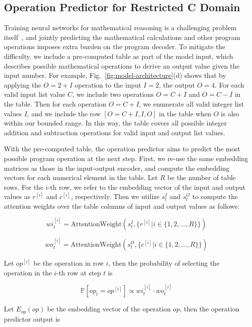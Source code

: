 
\subsection{Operation Predictor for Restricted C Domain}
\label{app:operation-predictor}
Training neural networks for mathematical reasoning is a challenging problem itself~\cite{saxton2019analysing,lample2019deep}, and jointly predicting the mathematical calculations and other program operations imposes extra burden on the program decoder. To mitigate the difficulty, we include a pre-computed table as part of the model input, which describes possible mathematical operations to derive an output value given the input number. For example, Fig.~\ref{fig:model-architecture}(d) shows that by applying the $O = 2 + I$ operation to the input $I=2$, the output $O=4$. For each valid input list value $C$, we include two operations $O = C + I$ and $O = C - I$ in the table. Then for each operation $O = C + I$, we enumerate all valid integer list values $I$, and we include the row $[O = C + I, I, O]$ in the table when $O$ is also within our bounded range. In this way, the table covers all possible integer addition and subtraction operations for valid input and output list values.  

With the pre-computed table, the operation predictor aims to predict the most possible program operation at the next step. First, we re-use the same embedding matrices as those in the input-output encoder, and compute the embedding vectors for each numerical element in the table. Let $R$ be the number of table rows. For the $i$-th row, we refer to the embedding vector of the input and output values as $r^{[i]}$ and $c^{[i]}$, respectively. Then we utilize $s_t^I$ and $s_t^O$ to compute the attention weights over the table columns of input and output values as follows:

\[wi^{[i]}_t=\mathrm{AttentionWeight}(s_t^I, \{r^{[i]}|i\in\{1, 2, ..., R\}\})\]

\[wo^{[i]}_t=\mathrm{AttentionWeight}(s_t^O, \{c^{[i]}|i\in\{1, 2, ..., R\}\})\]

Let $op^{[i]}$ be the operation in row $i$, then the probability of selecting the operation in the $i$-th row at step $t$ is

\[\mathbb{P}[op_t=op^{[i]}] \propto wi^{[i]}_t \cdot wo^{[i]}_t\]

Let $E_{op}(op)$ be the embedding vector of the operation $op$, then the operation predictor output is


